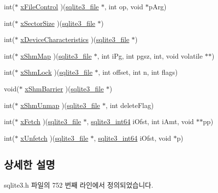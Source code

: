 \begin{DoxyCompactItemize}
\item 
int($\ast$ \hyperlink{structsqlite3__io__methods_a913b12deb1dcae2c61b90776bcd9d19c}{x\+File\+Control} )(\hyperlink{structsqlite3__file}{sqlite3\+\_\+file} $\ast$, int op, void $\ast$p\+Arg)
\item 
int($\ast$ \hyperlink{structsqlite3__io__methods_a7a1c0cf3c4de6402a69f50e625be5ca2}{x\+Sector\+Size} )(\hyperlink{structsqlite3__file}{sqlite3\+\_\+file} $\ast$)
\item 
int($\ast$ \hyperlink{structsqlite3__io__methods_abbf1b4769c310bfee517af815eed93e9}{x\+Device\+Characteristics} )(\hyperlink{structsqlite3__file}{sqlite3\+\_\+file} $\ast$)
\item 
int($\ast$ \hyperlink{structsqlite3__io__methods_a2222efe012f210417f9881103014cdc5}{x\+Shm\+Map} )(\hyperlink{structsqlite3__file}{sqlite3\+\_\+file} $\ast$, int i\+Pg, int pgsz, int, void volatile $\ast$$\ast$)
\item 
int($\ast$ \hyperlink{structsqlite3__io__methods_a2dbd4777e8ebce36b91dd5d64aef9bbf}{x\+Shm\+Lock} )(\hyperlink{structsqlite3__file}{sqlite3\+\_\+file} $\ast$, int offset, int n, int flags)
\item 
void($\ast$ \hyperlink{structsqlite3__io__methods_aa4e436fef318c4702940da870f8e2710}{x\+Shm\+Barrier} )(\hyperlink{structsqlite3__file}{sqlite3\+\_\+file} $\ast$)
\item 
int($\ast$ \hyperlink{structsqlite3__io__methods_a494ae8bbfe91c38598c73aaa18f1848f}{x\+Shm\+Unmap} )(\hyperlink{structsqlite3__file}{sqlite3\+\_\+file} $\ast$, int delete\+Flag)
\item 
int($\ast$ \hyperlink{structsqlite3__io__methods_a71e611fc755d95ffbd3e7ecb8cb5fae6}{x\+Fetch} )(\hyperlink{structsqlite3__file}{sqlite3\+\_\+file} $\ast$, \hyperlink{sqlite3_8h_a0a4d3e6c1ad46f90e746b920ab6ca0d2}{sqlite3\+\_\+int64} i\+Ofst, int i\+Amt, void $\ast$$\ast$pp)
\item 
int($\ast$ \hyperlink{structsqlite3__io__methods_abebf1bbaa50bea56f0e37d0f66193bda}{x\+Unfetch} )(\hyperlink{structsqlite3__file}{sqlite3\+\_\+file} $\ast$, \hyperlink{sqlite3_8h_a0a4d3e6c1ad46f90e746b920ab6ca0d2}{sqlite3\+\_\+int64} i\+Ofst, void $\ast$p)
\end{DoxyCompactItemize}


\subsection{상세한 설명}


sqlite3.\+h 파일의 752 번째 라인에서 정의되었습니다.



